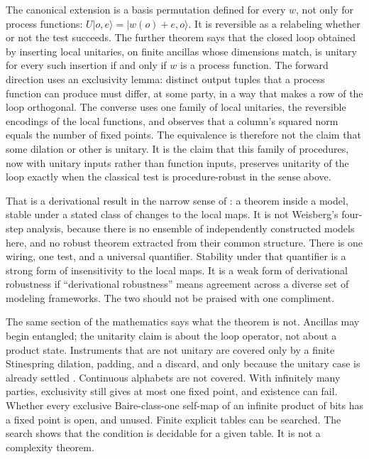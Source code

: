 \documentclass[12pt]{article}
\begin{document}
The canonical extension is a basis permutation defined for every \(w\), not only for process functions: \(U\lvert o,e\rangle=\lvert w(o)+e,o\rangle\). It is reversible as a relabeling whether or not the test succeeds. The further theorem says that the closed loop obtained by inserting local unitaries, on finite ancillas whose dimensions match, is unitary for every such insertion if and only if \(w\) is a process function. The forward direction uses an exclusivity lemma: distinct output tuples that a process function can produce must differ, at some party, in a way that makes a row of the loop orthogonal. The converse uses one family of local unitaries, the reversible encodings of the local functions, and observes that a column's squared norm equals the number of fixed points. The equivalence is therefore not the claim that some dilation or other is unitary. It is the claim that this family of procedures, now with unitary inputs rather than function inputs, preserves unitarity of the loop exactly when the classical test is procedure-robust in the sense above.

That is a derivational result in the narrow sense of \citet{kuorikoski2007}: a theorem inside a model, stable under a stated class of changes to the local maps. It is not Weisberg's four-step analysis, because there is no ensemble of independently constructed models here, and no robust theorem extracted from their common structure. There is one wiring, one test, and a universal quantifier. Stability under that quantifier is a strong form of insensitivity to the local maps. It is a weak form of derivational robustness if ``derivational robustness'' means agreement across a diverse set of modeling frameworks. The two should not be praised with one compliment.

The same section of the mathematics says what the theorem is not. Ancillas may begin entangled; the unitarity claim is about the loop operator, not about a product state. Instruments that are not unitary are covered only by a finite Stinespring dilation, padding, and a discard, and only because the unitary case is already settled \citep{stinespring1955}. Continuous alphabets are not covered. With infinitely many parties, exclusivity still gives at most one fixed point, and existence can fail. Whether every exclusive Baire-class-one self-map of an infinite product of bits has a fixed point is open, and unused. Finite explicit tables can be searched. The search shows that the condition is decidable for a given table. It is not a complexity theorem.
\end{document}

